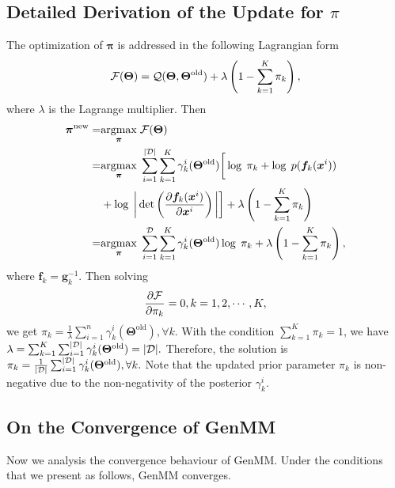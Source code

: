 \subsection{Detailed Derivation of the Update for $\pi$}
\label{subsubsec:Proof_for_update}

The optimization of $\bm{\pi}$ is addressed in the following Lagrangian form
\begin{equation}
  \mathcal{F}(\bm{\Theta}) = \mathcal{Q}(\bm{\Theta},\bm{\Theta}^{\mathrm{old}}) + \lambda
  \left( 1 - \sum_{k=1}^{K}\pi_k \right),
\end{equation}
where $\lambda$ is the Lagrange multiplier. Then
\begin{align}
  \bm{\pi}^{\mathrm{new}} =& \underset{\bm{\pi}}{\operatorname{argmax}}\;{ \mathcal{F}(\bm{\Theta})} \nonumber\\
  =&  \underset{\bm{\pi}}{\operatorname{argmax}}\;{}\sum_{i=1}^{| \mathcal{D} |}
     \sum_{k=1}^{K}\gamma_k^{i}(\bm{\Theta}^{\mathrm{old}})\bigg[
     \log\;\pi_k +   \log\;p(\bm{f}_k(\bm{x}^{i})) \nonumber \\
                           &+ \log\;\bigg|\det\left(
                             \frac{ \partial \bm{f}_k(\bm{x}^{i})}{\partial \bm{x}^{i}}
                             \right)\bigg|\bigg] + \lambda  \left( 1 - \sum_{k=1}^{K}\pi_k \right) \nonumber\\
  =& \underset{\bm{\pi}}{\operatorname{argmax}}\;{} \sum_{i=1}^{\mathcal{D}}
     \sum_{k=1}^{K}\gamma_k^{i}(\bm{\Theta}^{\mathrm{old}})
     \log\;\pi_k+ \lambda  \left( 1 - \sum_{k=1}^{K}\pi_k \right),
\end{align}
where $\bm{f}_k = \bm{g}_k^{-1}$. Then solving
\begin{equation}
  \frac{ \partial \mathcal{F}}{\partial \pi_k} = 0, k=1, 2, \cdots, K,
\end{equation}
we get 
$
\pi_k = \frac{1}{\lambda}
\sum_{i=1}^{n}\gamma_k^{i}(\bm{\Theta}^{\mathrm{old}}), \forall k.
$
With the condition $\sum_{k=1}^{K}\pi_k =1$, we have
$
\lambda = \sum_{k=1}^{K}\sum_{i=1}^{| \mathcal{D} |}\gamma_k^{i}(\bm{\Theta}^{\mathrm{old}}) =| \mathcal{D} |.
$
Therefore, the solution is
$
\pi_k = \frac{1}{| \mathcal{D} |}
\sum_{i=1}^{| \mathcal{D} |}\gamma_k^{i}(\bm{\Theta}^{\mathrm{old}}), \forall k.
$
Note that the updated prior parameter $\pi_k$
is non-negative due to the non-negativity of the posterior $\gamma_k^{i}$.

\subsection{On the Convergence of GenMM}
Now we analysis the convergence behaviour of GenMM. Under the conditions that we present as follows, GenMM converges. 

